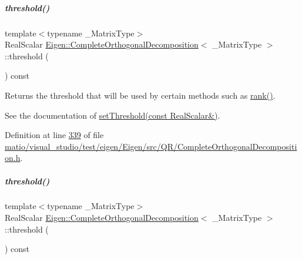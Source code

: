 \mbox{\label{group___q_r___module_a3909f07268496c0f08f1b57331d91075}} 
\subparagraph{\texorpdfstring{threshold()}{threshold()}\hspace{0.1cm}{\footnotesize\ttfamily [1/2]}}
{\footnotesize\ttfamily template$<$typename \+\_\+\+Matrix\+Type$>$ \\
Real\+Scalar \hyperlink{group___q_r___module_class_eigen_1_1_complete_orthogonal_decomposition}{Eigen\+::\+Complete\+Orthogonal\+Decomposition}$<$ \+\_\+\+Matrix\+Type $>$\+::threshold (\begin{DoxyParamCaption}{ }\end{DoxyParamCaption}) const\hspace{0.3cm}{\ttfamily [inline]}}

Returns the threshold that will be used by certain methods such as \hyperlink{group___q_r___module_af348f64b26f8467a020062c22b748806}{rank()}.

See the documentation of \hyperlink{group___q_r___module_aa9c9f7cbde9d58ca5552381b70ad8d82}{set\+Threshold(const Real\+Scalar\&)}. 

Definition at line \hyperlink{matio_2visual__studio_2test_2eigen_2_eigen_2src_2_q_r_2_complete_orthogonal_decomposition_8h_source_l00339}{339} of file \hyperlink{matio_2visual__studio_2test_2eigen_2_eigen_2src_2_q_r_2_complete_orthogonal_decomposition_8h_source}{matio/visual\+\_\+studio/test/eigen/\+Eigen/src/\+Q\+R/\+Complete\+Orthogonal\+Decomposition.\+h}.

\mbox{\label{group___q_r___module_a3909f07268496c0f08f1b57331d91075}} 
\subparagraph{\texorpdfstring{threshold()}{threshold()}\hspace{0.1cm}{\footnotesize\ttfamily [2/2]}}
{\footnotesize\ttfamily template$<$typename \+\_\+\+Matrix\+Type$>$ \\
Real\+Scalar \hyperlink{group___q_r___module_class_eigen_1_1_complete_orthogonal_decomposition}{Eigen\+::\+Complete\+Orthogonal\+Decomposition}$<$ \+\_\+\+Matrix\+Type $>$\+::threshold (\begin{DoxyParamCaption}{ }\end{DoxyParamCaption}) const\hspace{0.3cm}{\ttfamily [inline]}}

